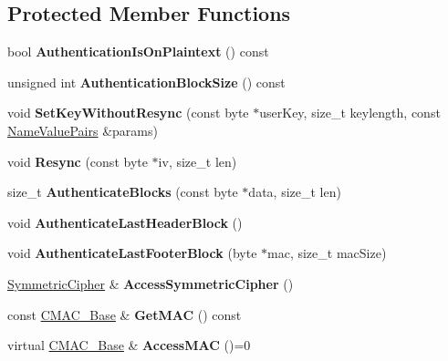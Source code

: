 \subsection*{Protected Member Functions}
\begin{DoxyCompactItemize}
\item 
\hypertarget{class_e_a_x___base_a08e2afdcf1df9b46d1860252c691f372}{
bool {\bfseries AuthenticationIsOnPlaintext} () const }
\label{class_e_a_x___base_a08e2afdcf1df9b46d1860252c691f372}

\item 
\hypertarget{class_e_a_x___base_af5020bfc16361cfabf115da2a0117395}{
unsigned int {\bfseries AuthenticationBlockSize} () const }
\label{class_e_a_x___base_af5020bfc16361cfabf115da2a0117395}

\item 
\hypertarget{class_e_a_x___base_ae4b944e00ff7cc1765d3f5ae2f54a237}{
void {\bfseries SetKeyWithoutResync} (const byte $\ast$userKey, size\_\-t keylength, const \hyperlink{class_name_value_pairs}{NameValuePairs} \&params)}
\label{class_e_a_x___base_ae4b944e00ff7cc1765d3f5ae2f54a237}

\item 
\hypertarget{class_e_a_x___base_a6add0e96f7c696c9e95aa390d8840021}{
void {\bfseries Resync} (const byte $\ast$iv, size\_\-t len)}
\label{class_e_a_x___base_a6add0e96f7c696c9e95aa390d8840021}

\item 
\hypertarget{class_e_a_x___base_ac08a34945094a4f3077f5a988dd9a5e0}{
size\_\-t {\bfseries AuthenticateBlocks} (const byte $\ast$data, size\_\-t len)}
\label{class_e_a_x___base_ac08a34945094a4f3077f5a988dd9a5e0}

\item 
\hypertarget{class_e_a_x___base_a864e7b1d1268bd0626681cf5cab81b1f}{
void {\bfseries AuthenticateLastHeaderBlock} ()}
\label{class_e_a_x___base_a864e7b1d1268bd0626681cf5cab81b1f}

\item 
\hypertarget{class_e_a_x___base_afe4534008e49942019a365a689a02ced}{
void {\bfseries AuthenticateLastFooterBlock} (byte $\ast$mac, size\_\-t macSize)}
\label{class_e_a_x___base_afe4534008e49942019a365a689a02ced}

\item 
\hypertarget{class_e_a_x___base_ab4c3c810f3a898ed704839cb29b500a9}{
\hyperlink{class_symmetric_cipher}{SymmetricCipher} \& {\bfseries AccessSymmetricCipher} ()}
\label{class_e_a_x___base_ab4c3c810f3a898ed704839cb29b500a9}

\item 
\hypertarget{class_e_a_x___base_a9c7c74a10804f1c4343d779289058987}{
const \hyperlink{class_c_m_a_c___base}{CMAC\_\-Base} \& {\bfseries GetMAC} () const }
\label{class_e_a_x___base_a9c7c74a10804f1c4343d779289058987}

\item 
\hypertarget{class_e_a_x___base_abea46c96e470ecdaeb6824fe26a089ad}{
virtual \hyperlink{class_c_m_a_c___base}{CMAC\_\-Base} \& {\bfseries AccessMAC} ()=0}
\label{class_e_a_x___base_abea46c96e470ecdaeb6824fe26a089ad}

\end{DoxyCompactItemize}

